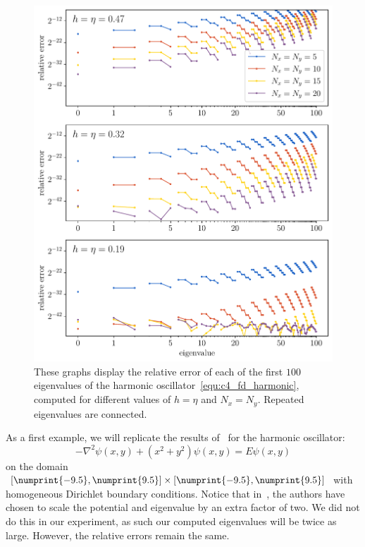 \begin{figure}
    \begin{center}
        \includegraphics[width=\textwidth]{img/chapter4/fd_harmonic.pdf}
    \end{center}
    \caption{These graphs display the relative error of each of the first $100$ eigenvalues of the harmonic oscillator~\eqref{equ:c4_fd_harmonic}, computed for different values of $h = \eta$ and $N_x = N_y$. Repeated eigenvalues are connected.}
    \label{fig:c4_fd_harmonic}
\end{figure}

As a first example, we will replicate the results of~\cite{wang_new_2009} for the harmonic oscillator:
\begin{equation}\label{equ:c4_fd_harmonic}
    -\nabla^2 \psi(x, y) + \left(x^2 + y^2\right) \psi(x, y) = E \psi(x, y)
\end{equation}
on the domain $[\numprint{-9.5}, \numprint{9.5}] \times [\numprint{-9.5}, \numprint{9.5}]$ with homogeneous Dirichlet boundary conditions. Notice that in~\cite{wang_new_2009}, the authors have chosen to scale the potential and eigenvalue by an extra factor of two. We did not do this in our experiment, as such our computed eigenvalues will be twice as large. However, the relative errors remain the same.

